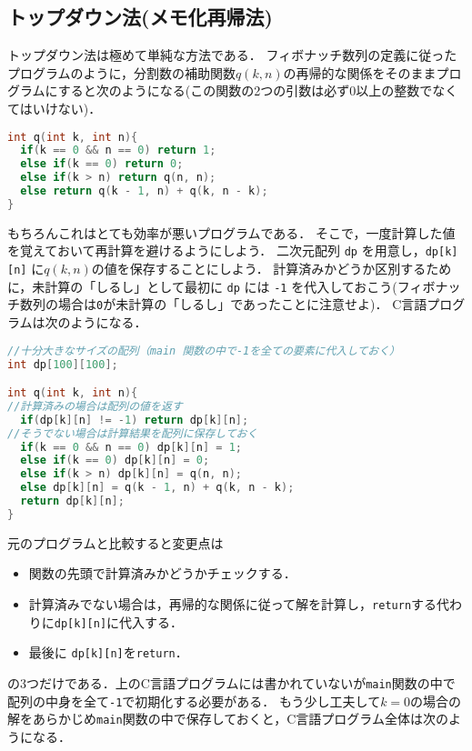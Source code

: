 \documentclass[a4paper,twoside,onecolumn,openany,article]{memoir}
\theoremstyle{remark}
\begin{document}
\subsection{トップダウン法(メモ化再帰法)}
トップダウン法は極めて単純な方法である．
フィボナッチ数列の定義に従ったプログラムのように，分割数の補助関数$q(k,n)$の再帰的な関係をそのままプログラムにすると次のようになる(この関数の2つの引数は必ず0以上の整数でなくてはいけない)．

\begin{lstlisting}[basicstyle=\ttfamily\small,showstringspaces=false,language=C,frame=single]
int q(int k, int n){
  if(k == 0 && n == 0) return 1;
  else if(k == 0) return 0;
  else if(k > n) return q(n, n);
  else return q(k - 1, n) + q(k, n - k);
}
\end{lstlisting}
もちろんこれはとても効率が悪いプログラムである．
そこで，一度計算した値を覚えておいて再計算を避けるようにしよう．
二次元配列 \texttt{dp} を用意し，\texttt{dp[k][n]} に$q(k, n)$の値を保存することにしよう．
計算済みかどうか区別するために，未計算の「しるし」として最初に \texttt{dp} には \texttt{-1} を代入しておこう(フィボナッチ数列の場合は\texttt{0}が未計算の「しるし」であったことに注意せよ)．
C言語プログラムは次のようになる．
\begin{lstlisting}[basicstyle=\ttfamily\small,showstringspaces=false,language=C,frame=single]
//十分大きなサイズの配列（main 関数の中で-1を全ての要素に代入しておく）
int dp[100][100];

int q(int k, int n){
//計算済みの場合は配列の値を返す
  if(dp[k][n] != -1) return dp[k][n];
//そうでない場合は計算結果を配列に保存しておく
  if(k == 0 && n == 0) dp[k][n] = 1;
  else if(k == 0) dp[k][n] = 0;
  else if(k > n) dp[k][n] = q(n, n);
  else dp[k][n] = q(k - 1, n) + q(k, n - k);
  return dp[k][n];
}
\end{lstlisting}
元のプログラムと比較すると変更点は
\begin{itemize}
\item 関数の先頭で計算済みかどうかチェックする．
\item 計算済みでない場合は，再帰的な関係に従って解を計算し，\texttt{return}する代わりに\texttt{dp[k][n]}に代入する．
\item 最後に \texttt{dp[k][n]}を\texttt{return}．
\end{itemize}
の3つだけである．上のC言語プログラムには書かれていないが\texttt{main}関数の中で配列の中身を全て\texttt{-1}で初期化する必要がある．
もう少し工夫して$k=0$の場合の解をあらかじめ\texttt{main}関数の中で保存しておくと，C言語プログラム全体は次のようになる．
\end{document}
